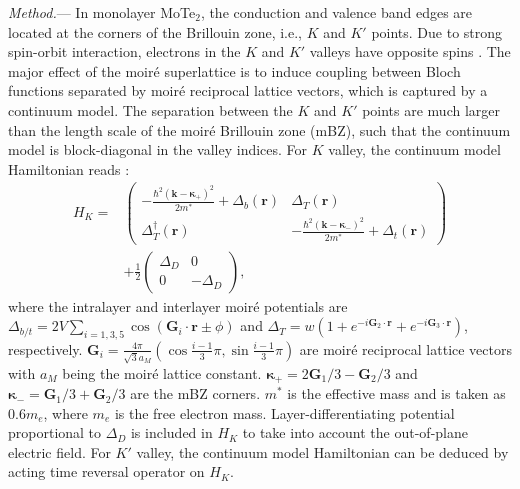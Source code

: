 \documentclass[twocolumn,aps,prl,superscriptaddress]{revtex4-2}
\begin{document}
\textit{Method.}---
In monolayer MoTe$_2$, the conduction and valence band edges are located at the corners of the Brillouin zone, i.e., $K$ and $K'$ points. Due to strong spin-orbit interaction, electrons in the $K$ and $K'$ valleys have opposite spins \cite{xiao2012coupled}. The major effect of the moir\'e superlattice is to induce coupling between Bloch functions separated by moir\'e reciprocal lattice vectors, which is captured by a continuum model. The separation between the $K$ and $K'$ points are much larger than the length scale of the moir\'e Brillouin zone (mBZ), such that the continuum model is block-diagonal in the valley indices. For $K$ valley, the continuum model Hamiltonian reads \cite{wu2019topological,yu2020giant}:
\begin{equation}\label{eq:continuum_ham}
\begin{aligned}
H_K = & \left(
    \begin{matrix}
        -\frac{\hbar^2(\bm{k}-\bm{\kappa}_+)^2}{2m^*} + \Delta_b(\bm{r})  & \Delta_T(\bm{r}) \\
        \Delta_T^{\dagger}(\bm{r}) & -\frac{\hbar^2(\bm{k}-\bm{\kappa}_-)^2}{2m^*} + \Delta_t(\bm{r})
    \end{matrix}
\right) \\ 
& + \frac{1}{2}\left(\begin{matrix}
    \Delta_D & 0 \\
        0 & -\Delta_D
    \end{matrix}\right),
\end{aligned}
\end{equation}
where the intralayer and interlayer moir\'e potentials are $\Delta_{b/t}=2V\sum_{i=1,3,5}\cos(\bm{G}_i\cdot\bm{r}\pm\phi)$ and $\Delta_T = w(1+e^{-i \bm{G}_2 \cdot \bm{r}} + e^{-i \bm{G}_3 \cdot \bm{r}})$, respectively. $\bm{G}_i = \frac{4\pi}{\sqrt{3} a_M }(\cos\frac{i-1}{3}\pi, \sin\frac{i-1}{3}\pi)$ are moir\'e reciprocal lattice vectors with $a_M$ being the moir\'e lattice constant. $\bm{\kappa}_+ = 2\bm{G}_1 / 3 - \bm{G}_2 / 3$ and $\bm{\kappa}_- = \bm{G}_1 / 3 + \bm{G}_2 / 3$ are the mBZ corners. $m^*$ is the effective mass and is taken as $0.6 m_e$, where $m_e$ is the free electron mass. Layer-differentiating potential proportional to $\Delta_D$ is included in $H_K$ to take into account the out-of-plane electric field. For $K'$ valley, the continuum model Hamiltonian can be deduced by acting time reversal operator on $H_K$.

\end{document}
